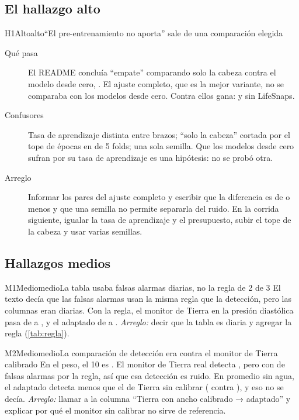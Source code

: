 \subsection{El hallazgo alto}\label{sec:h1}

\begin{hallazgo}{H1}{Alto}{alto}{\enquote{El pre-entrenamiento no aporta} sale de una comparación elegida}
\begin{description}
\item[Qué pasa] El README concluía \enquote{empate} comparando solo la cabeza contra el modelo desde cero,
   . El ajuste completo, que es la mejor variante, no se comparaba con
  los modelos desde cero. Contra ellos gana:   y 
   sin LifeSnaps.
\item[Confusores] Tasa de aprendizaje distinta entre brazos; \enquote{solo la cabeza} cortada por el tope de épocas
  en  de 5 folds; una sola semilla. Que los modelos desde cero sufran por su tasa de aprendizaje
  es una hipótesis: no se probó otra.
\item[Arreglo] Informar los pares del ajuste completo y escribir que la diferencia es de  o
  menos y que una semilla no permite separarla del ruido. En la corrida siguiente, igualar la tasa de aprendizaje y el
  presupuesto, subir el tope de la cabeza y usar varias semillas.
\end{description}
\end{hallazgo}

\subsection{Hallazgos medios}

\begin{hallazgo}{M1}{Medio}{medio}{La tabla usaba falsas alarmas diarias, no la regla de 2 de 3}
El texto decía que las falsas alarmas usan la misma regla que la detección, pero las columnas eran diarias. Con la
regla, el monitor de Tierra en la presión diastólica pasa de  a
\pct, y el adaptado de  a \pct.
\emph{Arreglo:} decir que la tabla es diaria y agregar la regla (\cref{tab:regla}).
\end{hallazgo}

\begin{hallazgo}{M2}{Medio}{medio}{La comparación de detección era contra el monitor de Tierra calibrado}
En el peso, el 10\pct{} es . El monitor de Tierra real detecta
\pct, pero con \pct{} de falsas alarmas por la regla, así que esa
detección es ruido. En promedio sin agua, el adaptado detecta menos que el de Tierra sin calibrar
( contra \pct), y eso no se decía. \emph{Arreglo:} llamar a la columna
\enquote{Tierra con ancho calibrado → adaptado} y explicar por qué el monitor sin calibrar no sirve de referencia.
\end{hallazgo}

